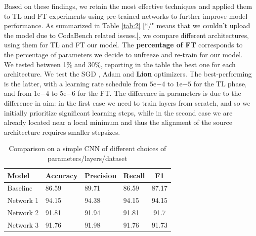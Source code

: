 \documentclass[11pt]{template}
\begin{document}
\begin{multicols}{2}
Based on these findings, we retain the most effective techniques and applied them to TL and FT experiments using pre-trained networks to further improve model performance.
As summarized in Table \ref{tab:2} [``/" means that we couldn't upload the model due to CodaBench related issues.], we compare different architectures, using them for TL and FT our model.
The \textbf{percentage of FT} corresponds to the percentage of parameters we decide to unfreeze and re-train for our model. We tested between 1\% and 30\%, reporting in the table the best one for each architecture.
We test the SGD \cite{mandt2018stochasticgradientdescentapproximate}, Adam \cite{yun2024stochgradadamacceleratingneuralnetworks} and \textbf{Lion} \cite{chen2023} optimizers. The best-performing is the latter, with a learning rate schedule from $5\mathrm{e}{-4}$ to $1\mathrm{e}{-5}$ for the TL phase, and from $1\mathrm{e}{-4}$ to $5\mathrm{e}{-6}$ for the FT. The difference in parameters is due to the difference in aim: in the first case we need to train layers from scratch, and so we initially prioritize significant learning steps, while in the second case we are already located near a local minimum and thus the alignment of the source architecture requires smaller stepsizes. 
\FloatBarrier
\begin{table}[ht]
\centering
\setlength{\tabcolsep}{3pt}
\caption{Comparison on a simple CNN of different choices of parameters/layers/dataset}
\begin{tabularx}{\textwidth}{lYYYc}
    \toprule
    Model & Accuracy & Precision & Recall & F1\\
    \midrule
    Baseline  & 86.59 & 89.71 & 86.59 & 87.17\\

    Network 1 & 94.15 & 94.38 & 94.15 & 94.15  \\

    Network 2 & 91.81 & 91.94 & 91.81 & 91.7 \\

    Network 3 & 91.76 & 91.98 & 91.76 & 91.73  \\


\end{tabularx}
\end{table}
\end{multicols}
\end{document}
